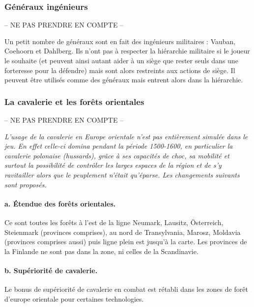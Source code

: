\subsubsection{Généraux ingénieurs}
-- NE PAS PRENDRE EN COMPTE --

Un petit nombre de généraux sont en fait des ingénieurs militaires :
Vauban, Coehoorn et Dahlberg. Ils n'ont pas à respecter la
hiérarchie militaire si le joueur le souhaite (et peuvent ainsi autant
aider à un siège que rester seuls dans une forteresse pour
la défendre) mais sont alors restreints aux actions de siège.
Il peuvent être utilisés comme des généraux mais entrent
alors dans la hiérarchie.



\subsubsection{La cavalerie et les forêts orientales}\label{foretOrientale}
-- NE PAS PRENDRE EN COMPTE --

\textit{
L'usage de la cavalerie en Europe orientale n'est pas entièrement
simulée dans le jeu. En effet celle-ci domina pendant la période
1500-1600, en particulier la cavalerie polonaise (hussards), grâce à ses
capacités de choc, sa mobilité et surtout la possibilité de contrôler
les larges espaces de la région et de s'y ravitailler alors que le
peuplement n'était qu'éparse. Les changements suivants sont proposés.}

\paragraph{a. Étendue des forêts orientales.}
Ce sont toutes les forêts à l'est de la ligne Neumark, Lausitz,
\"Osterreich, Steienmark (provinces comprises), au nord de
Transylvania, Marosz, Moldavia (provinces comprises aussi)
puis ligne plein est jusqu'à la carte. Les provinces de la Finlande
ne sont pas dans la zone, ni celles de la Scandinavie.


\paragraph{b. Supériorité de cavalerie.}
Le bonus de supériorité de cavalerie en combat est rétabli
dans les zones de forêt d'europe orientale pour certaines
technologies.

